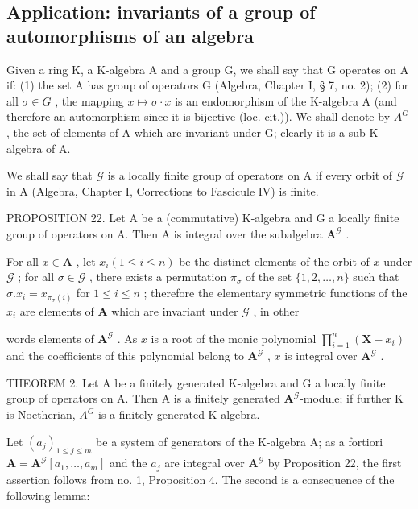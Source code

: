 \subsection{Application: invariants of a group of automorphisms of an algebra}

Given a ring K, a K-algebra A and a group G, we shall say that G operates on A if: (1) the set A has group of operators G (Algebra, Chapter I, § 7, no. 2); (2) for all \(\sigma \in G\) , the mapping \(x \mapsto \sigma \cdot x\) is an endomorphism of the K-algebra A (and therefore an automorphism since it is bijective (loc. cit.)). We shall denote by \(A^{G}\) , the set of elements of A which are invariant under G; clearly it is a sub-K-algebra of A.

We shall say that \(\mathcal{G}\) is a locally finite group of operators on A if every orbit of \(\mathcal{G}\) in A (Algebra, Chapter I, Corrections to Fascicule IV) is finite.

PROPOSITION 22. Let A be a (commutative) K-algebra and G a locally finite group of operators on A. Then A is integral over the subalgebra \(\mathbf{A}^{\mathcal{G}}\) .

For all \(x \in \mathbf{A}\) , let \(x_{i} (1 \leqslant i \leqslant n)\) be the distinct elements of the orbit of \(x\) under \(\mathcal{G}\) ; for all \(\sigma \in \mathcal{G}\) , there exists a permutation \(\pi_{\sigma}\) of the set \(\{1, 2, \ldots, n\}\) such that \(\sigma. x_{i} = x_{\pi_{\sigma}(i)}\) for \(1 \leqslant i \leqslant n\) ; therefore the elementary symmetric functions of the \(x_{i}\) are elements of \(\mathbf{A}\) which are invariant under \(\mathcal{G}\) , in other

words elements of \(\mathbf{A}^{\mathcal{G}}\) . As \(x\) is a root of the monic polynomial \(\prod_{i=1}^{n} (\mathbf{X} - x_i)\) and the coefficients of this polynomial belong to \(\mathbf{A}^{\mathcal{G}}\) , \(x\) is integral over \(\mathbf{A}^{\mathcal{G}}\) .

THEOREM 2. Let A be a finitely generated K-algebra and G a locally finite group of operators on A. Then A is a finitely generated \(\mathbf{A}^{\mathcal{G}}\)-module; if further K is Noetherian, \(A^{G}\) is a finitely generated K-algebra.

Let \((a_{j})_{1\leqslant j\leqslant m}\) be a system of generators of the K-algebra A; as a fortiori \(\mathbf{A} = \mathbf{A}^{\mathcal{G}}[a_1,\ldots ,a_m]\) and the \(a_{j}\) are integral over \(\mathbf{A}^{\mathcal{G}}\) by Proposition 22, the first assertion follows from no. 1, Proposition 4. The second is a consequence of the following lemma:

